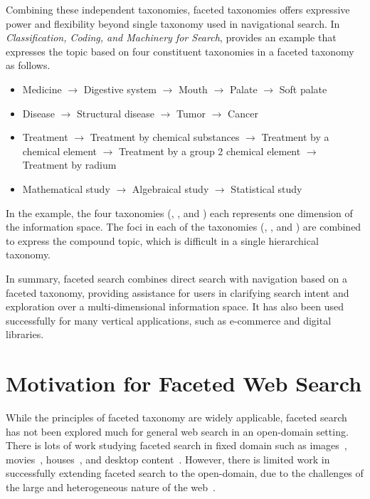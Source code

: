 Combining these independent taxonomies, faceted taxonomies offers expressive power and flexibility beyond single taxonomy used in navigational search. In \textit{Classification, Coding, and Machinery for Search}, \citet{ranganathan1950classification} provides an example that expresses the topic  based on four constituent taxonomies in a faceted taxonomy as follows.
\begin{itemize}
 \item Medicine $\rightarrow$ Digestive system $\rightarrow$ Mouth $\rightarrow$ Palate $\rightarrow$ Soft palate
\item Disease $\rightarrow$ Structural disease $\rightarrow$ Tumor $\rightarrow$ Cancer
\item Treatment $\rightarrow$ Treatment by chemical substances $\rightarrow$ Treatment by a chemical element  $\rightarrow$ Treatment by a group 2 chemical element $\rightarrow$ Treatment by radium
\item Mathematical study $\rightarrow$ Algebraical study $\rightarrow$ Statistical study
\end{itemize}
In the example, the four taxonomies (, ,  and ) each represents one dimension of the information space. The foci in each of the taxonomies (, ,  and ) are combined to express the compound topic, which is difficult in a single hierarchical taxonomy.



In summary, faceted search combines direct search with navigation based on a faceted taxonomy, providing assistance for users in clarifying search intent and exploration over a multi-dimensional information space. It has also been used successfully for many vertical applications, such as e-commerce and digital libraries. 

\section{Motivation for Faceted Web Search}
\label{sec:intro-motivation}
While the principles of faceted taxonomy are widely applicable, faceted search has not been explored much for general web search in an open-domain setting. There is lots of work studying faceted search in fixed domain such as images~\cite{cutrell2006fast}, movies~\cite{koren2008personalized}, houses~\cite{shneiderman1994dynamic}, and desktop content~\cite{cutrell2006fast}. However, there is limited work in successfully extending faceted search to the open-domain, due to the challenges of the large and heterogeneous nature of the web~\cite{teevan2008challenges}.

